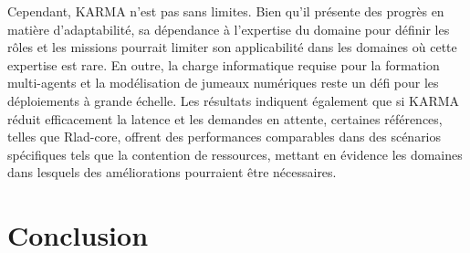 Cependant, KARMA n'est pas sans limites. Bien qu'il présente des progrès en matière d'adaptabilité, sa dépendance à l'expertise du domaine pour définir les rôles et les missions pourrait limiter son applicabilité dans les domaines où cette expertise est rare. En outre, la charge informatique requise pour la formation multi-agents et la modélisation de jumeaux numériques reste un défi pour les déploiements à grande échelle. Les résultats indiquent également que si KARMA réduit efficacement la latence et les demandes en attente, certaines références, telles que Rlad-core, offrent des performances comparables dans des scénarios spécifiques tels que la contention de ressources, mettant en évidence les domaines dans lesquels des améliorations pourraient être nécessaires.

\section{Conclusion}
\label{sec:conclusion}


